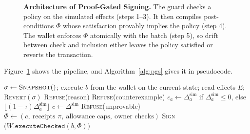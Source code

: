 \documentclass[11pt]{article}
\begin{document}
\begin{figure}[t]
{}
\caption{\textbf{Architecture of Proof-Gated Signing.} The guard checks a policy on the simulated effects (steps 1--3). It then compiles post-conditions $\Phi$ whose satisfaction provably implies the policy (step 4). The wallet enforces $\Phi$ atomically with the batch (step 5), so drift between check and inclusion either leaves the policy satisfied or reverts the transaction.}
\label{fig:arch}
\end{figure}

Figure~\ref{fig:arch} shows the pipeline, and Algorithm~\ref{alg:pgs} gives it in pseudocode.

\begin{algorithm}[t]
\caption{Proof-Gated Signing for one proposed batch $b$}
\label{alg:pgs}
\small
\begin{algorithmic}[1]
\State $\sigma \gets \textsc{Snapshot}()$; execute $b$ from the wallet on the current state; read effects $E$; \textsc{Revert}$(\sigma)$
 \Return \textsc{Refuse}(reason) \EndIf
{} \Return \textsc{Refuse}(counterexample) \EndIf
\State $c_a \gets \Delta^{\text{sim}}_a$ if $\Delta^{\text{sim}}_a\le 0$, else $\lfloor(1-\tau)\Delta^{\text{sim}}_a\rfloor$ 
 $c\gets\Delta^{\text{sim}}$ 
   \Return \textsc{Refuse}(unprovable) \EndIf
\EndIf
\State $\Phi\gets(c,\ \text{receipts } \pi,\ \text{allowance caps},\ \text{owner checks})$
\State \Return \textsc{Sign}$\big(W.\texttt{executeChecked}(b,\Phi)\big)$
\end{algorithmic}
\end{algorithm}
\end{document}
